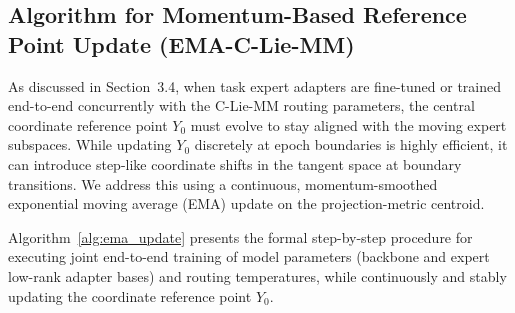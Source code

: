 \documentclass{article}
\theoremstyle{plain}
\theoremstyle{definition}
\theoremstyle{remark}
\begin{document}
\subsection{Algorithm for Momentum-Based Reference Point Update (EMA-C-Lie-MM)}
\label{sec:appendix_ema}
As discussed in Section~3.4, when task expert adapters are fine-tuned or trained end-to-end concurrently with the C-Lie-MM routing parameters, the central coordinate reference point $Y_0$ must evolve to stay aligned with the moving expert subspaces. While updating $Y_0$ discretely at epoch boundaries is highly efficient, it can introduce step-like coordinate shifts in the tangent space at boundary transitions. We address this using a continuous, momentum-smoothed exponential moving average (EMA) update on the projection-metric centroid. 

Algorithm~\ref{alg:ema_update} presents the formal step-by-step procedure for executing joint end-to-end training of model parameters (backbone and expert low-rank adapter bases) and routing temperatures, while continuously and stably updating the coordinate reference point $Y_0$.
\end{document}
